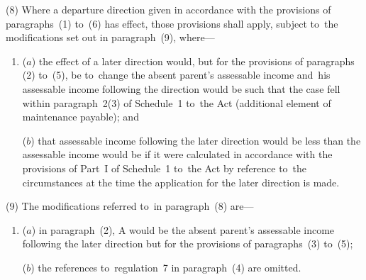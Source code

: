 \documentclass[12pt,a4paper]{article}
\begin{document}


(8) Where a departure direction given in accordance with the provisions of 
paragraphs~(1) to~(6)  %
has effect, those provisions shall apply, subject to~the modifications set out in paragraph~(9), where—
\begin{enumerate}\item[]
($a$) the effect of a later direction would, but for the provisions of paragraphs
(2) to~(5), be to~change the absent parent’s assessable income and~his
assessable income following the direction would be such that the case fell
within paragraph~2(3) of Schedule~1 to~the Act (additional element of
maintenance payable); and

($b$) that assessable income following the later direction would be less than the
assessable income would be if it were calculated in accordance with the
provisions of Part~I of Schedule~1 to~the Act by reference to~the circumstances
at the time the application for the later direction is made.
\end{enumerate}

(9) The modifications referred to~in paragraph~(8) are—
\begin{enumerate}\item[]
($a$) in paragraph~(2), A would be the absent parent’s assessable income following
the later direction but for the provisions of paragraphs~(3) to~(5);

($b$) the references to~regulation~7 in paragraph~(4) are omitted.
\end{enumerate}

\end{document}
